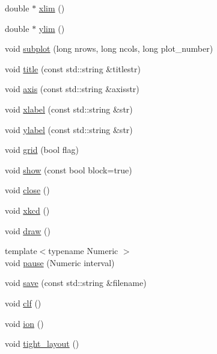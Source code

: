 \begin{DoxyCompactItemize}
\item 
double $\ast$ \mbox{\hyperlink{namespacematplotlibcpp_a8a7686cbe6e2e82e8bd09add8571b31c}{xlim}} ()
\item 
double $\ast$ \mbox{\hyperlink{namespacematplotlibcpp_a2bbe226f1dee9763197d9ab7692f4dc7}{ylim}} ()
\item 
void \mbox{\hyperlink{namespacematplotlibcpp_a78f4b6d50e52d1782d52df692232f4e1}{subplot}} (long nrows, long ncols, long plot\+\_\+number)
\item 
void \mbox{\hyperlink{namespacematplotlibcpp_aa9e0ff1c2399713260568f29c3e2188b}{title}} (const std\+::string \&titlestr)
\item 
void \mbox{\hyperlink{namespacematplotlibcpp_aab5287e30ebd90df0f5614d8da0f5291}{axis}} (const std\+::string \&axisstr)
\item 
void \mbox{\hyperlink{namespacematplotlibcpp_a8b8f1bb0cc3640fe5140f5a012e4a1c0}{xlabel}} (const std\+::string \&str)
\item 
void \mbox{\hyperlink{namespacematplotlibcpp_a5fa0cba78b9695adc213d2d952168442}{ylabel}} (const std\+::string \&str)
\item 
void \mbox{\hyperlink{namespacematplotlibcpp_ae0bbf80e73099a91df28e4fb871b166a}{grid}} (bool flag)
\item 
void \mbox{\hyperlink{namespacematplotlibcpp_ac7b2ae71a81811dfb69bcef95ee8390d}{show}} (const bool block=true)
\item 
void \mbox{\hyperlink{namespacematplotlibcpp_a62aaaf872c41a9d1b71add44c0cc0447}{close}} ()
\item 
void \mbox{\hyperlink{namespacematplotlibcpp_aca0fdbeae2fd86ab7291661f154f83ff}{xkcd}} ()
\item 
void \mbox{\hyperlink{namespacematplotlibcpp_acd9fc5bb7916c735390c2056214b12be}{draw}} ()
\item 
{\footnotesize template$<$typename Numeric $>$ }\\void \mbox{\hyperlink{namespacematplotlibcpp_aa5bc4092c9e2acbb2c6ec4efd024cf2f}{pause}} (Numeric interval)
\item 
void \mbox{\hyperlink{namespacematplotlibcpp_a46a2869ed7cd834e93125a20e2a294c2}{save}} (const std\+::string \&filename)
\item 
void \mbox{\hyperlink{namespacematplotlibcpp_adea4113b0ff7f393e18f1a99eb7e1718}{clf}} ()
\item 
void \mbox{\hyperlink{namespacematplotlibcpp_a9bddb5276ddc48f4ff9c2b36b98db71a}{ion}} ()
\item 
void \mbox{\hyperlink{namespacematplotlibcpp_a14e2b6e595e057f553ef7b14ddcda82a}{tight\+\_\+layout}} ()
\end{DoxyCompactItemize}


